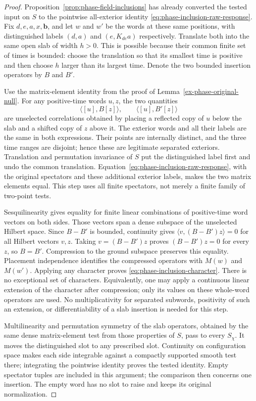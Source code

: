 \begin{proof}
Proposition~\ref{prop:phase-field-inclusions} has already converted the
tested input on $S$ to the pointwise all-exterior identity
\eqref{eq:phase-inclusion-raw-response}. Fix $d,e,a,x,\boldsymbol b$,
and let $w$ and $w'$ be the words at these same positions, with distinguished
labels $(d,a)$ and $(e,K_{de}a)$ respectively. Translate both into the
same open slab of width $h>0$. This is possible because their common
finite set of times is bounded: choose the translation so that its
smallest time is positive and then choose $h$ larger than its largest
time. Denote the two bounded insertion operators by $B$ and $B'$.

Use the matrix-element identity from the proof of
Lemma~\ref{ex-phase-original-null}. For any positive-time words $u,z$,
the two quantities
\[
 \langle[u],B[z]\rangle,\qquad
 \langle[u],B'[z]\rangle
\]
are unselected correlations obtained by placing a reflected copy of $u$
below the slab and a shifted copy of $z$ above it. The exterior words
and all their labels are the same in both expressions. Their points are
internally distinct, and the three time ranges are disjoint; hence these
are legitimate separated exteriors. Translation and permutation
invariance of $S$ put the distinguished label first and undo the common
translation. Equation~\eqref{eq:phase-inclusion-raw-response}, with the
original spectators and these additional exterior labels, makes the two
matrix elements equal. This step uses all finite spectators, not merely
a finite family of two-point tests.

Sesquilinearity gives equality for finite linear combinations of
positive-time word vectors on both sides. Those vectors span a dense
subspace of the unselected Hilbert space. Since $B-B'$ is bounded,
continuity gives $\langle v,(B-B')z\rangle=0$ for all Hilbert vectors
$v,z$. Taking $v=(B-B')z$ proves $(B-B')z=0$ for every $z$, so $B=B'$.
Compression to the ground subspace preserves this equality. Placement
independence identifies the compressed operators with $M(w)$ and $M(w')$.
Applying any character proves \eqref{eq:phase-inclusion-character}.
There is no exceptional set of characters. Equivalently, one may apply a
continuous linear extension of the character after compression; only its
values on these whole-word operators are used. No multiplicativity for
separated subwords, positivity of such an extension, or differentiability
of a slab insertion is needed for this step.

Multilinearity and permutation symmetry of the slab operators, obtained
by the same dense matrix-element test from those properties of $S$,
pass to every $S_\chi$.
It moves the distinguished slot to any prescribed slot. Continuity on
configuration space makes each side integrable against a compactly
supported smooth test there; integrating the pointwise identity proves
the tested identity. Empty spectator tuples are included in this argument;
the comparison then concerns one insertion. The empty word has no slot
to raise and keeps its original normalization.


\end{proof}
